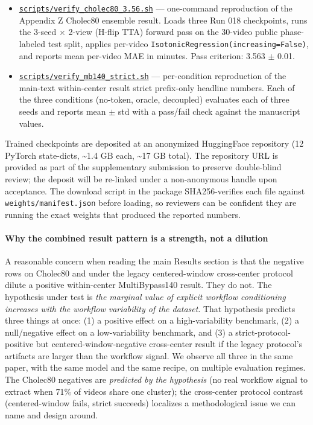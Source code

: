 \begin{itemize}
\tightlist
\item
  \href{reproducibility/scripts/verify_cholec80_3.56.sh}{\texttt{scripts/verify\_cholec80\_3.56.sh}}
  --- one-command reproduction of the Appendix Z Cholec80 ensemble
  result. Loads three Run 018 checkpoints, runs the 3-seed $\times$ 2-view
  (H-flip TTA) forward pass on the 30-video public phase-labeled test
  split, applies per-video
  \texttt{IsotonicRegression(increasing=False)}, and reports mean
  per-video MAE in minutes. Pass criterion: 3.563 $\pm$ 0.01.
\item
  \href{reproducibility/scripts/verify_mb140_strict.sh}{\texttt{scripts/verify\_mb140\_strict.sh}}
  --- per-condition reproduction of the main-text within-center result strict prefix-only headline
  numbers. Each of the three conditions (no-token, oracle, decoupled)
  evaluates each of three seeds and reports mean $\pm$ std with a pass/fail
  check against the manuscript values.
\end{itemize}

Trained checkpoints are deposited at an anonymized HuggingFace
repository (12 PyTorch state-dicts, \textasciitilde1.4 GB
each, \textasciitilde17 GB total). The repository URL is provided as part of the
supplementary submission to preserve double-blind review; the deposit
will be re-linked under a non-anonymous handle upon acceptance. The
download script in the package SHA256-verifies each file against
\texttt{weights/manifest.json} before loading, so reviewers can be
confident they are running the exact weights that produced the reported
numbers.

\paragraph{Why the combined result pattern is a strength, not a
dilution}\label{why-the-combined-result-pattern-is-a-strength-not-a-dilution}

A reasonable concern when reading the main Results section is that the negative rows on
Cholec80 and under the legacy centered-window cross-center protocol
dilute a positive within-center MultiBypass140 result. They do not. The
hypothesis under test is \emph{the marginal value of explicit workflow
conditioning increases with the workflow variability of the dataset}.
That hypothesis predicts three things at once: (1) a positive effect on
a high-variability benchmark, (2) a null/negative effect on a
low-variability benchmark, and (3) a strict-protocol-positive but
centered-window-negative cross-center result if the legacy protocol's
artifacts are larger than the workflow signal. We observe all three in
the same paper, with the same model and the same recipe, on multiple
evaluation regimes. The Cholec80 negatives are \emph{predicted by the
hypothesis} (no real workflow signal to extract when 71\% of videos
share one cluster); the cross-center protocol contrast (centered-window
fails, strict succeeds) localizes a methodological issue we can name and
design around.

